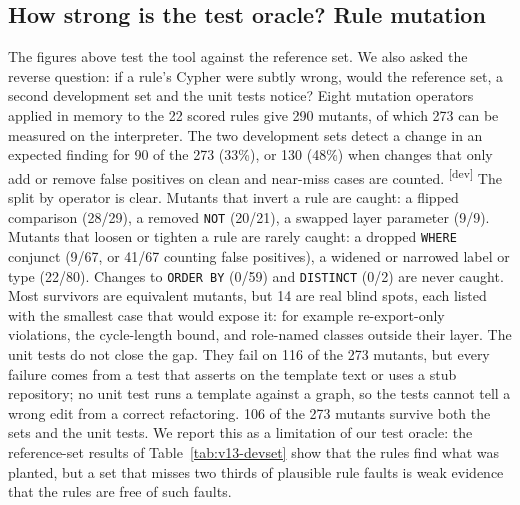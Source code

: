 \documentclass[10pt,a4paper]{article}
\newcommand{\devset}{\textsuperscript{\textsf{\tiny[dev]}}}
\begin{document}
\subsection{How strong is the test oracle? Rule mutation}\label{sec:v13-mutation}

The figures above test the tool against the reference set. We also asked the reverse question: if a rule's Cypher
were subtly wrong, would the reference set, a second development set and the unit tests notice? Eight mutation
operators applied in memory to the 22 scored rules give 290 mutants, of which 273 can be measured on the
interpreter. The two development sets detect a change in an expected finding for 90 of the 273 (33\%), or 130
(48\%) when changes that only add or remove false positives on clean and near-miss cases are counted.
\devset{}
The split by operator is clear. Mutants that invert a rule are caught: a flipped comparison (28/29), a removed
\texttt{NOT} (20/21), a swapped layer parameter (9/9). Mutants that loosen or tighten a rule are rarely caught:
a dropped \texttt{WHERE} conjunct (9/67, or 41/67 counting false positives), a widened or narrowed label or type
(22/80). Changes to \texttt{ORDER BY} (0/59) and \texttt{DISTINCT} (0/2) are never caught. Most survivors are
equivalent mutants, but 14 are real blind spots, each listed with the smallest case that would expose it: for
example re-export-only violations, the cycle-length bound, and role-named classes outside their layer.
The unit tests do not close the gap. They fail on 116 of the 273 mutants, but every failure comes from a test that
asserts on the template text or uses a stub repository; no unit test runs a template against a graph, so the tests
cannot tell a wrong edit from a correct refactoring. 106 of the 273 mutants survive both the sets and the unit tests.
We report this as a limitation of our test oracle: the reference-set results of Table~\ref{tab:v13-devset} show
that the rules find what was planted, but a set that misses two thirds of plausible rule faults is weak evidence
that the rules are free of such faults.
\end{document}
